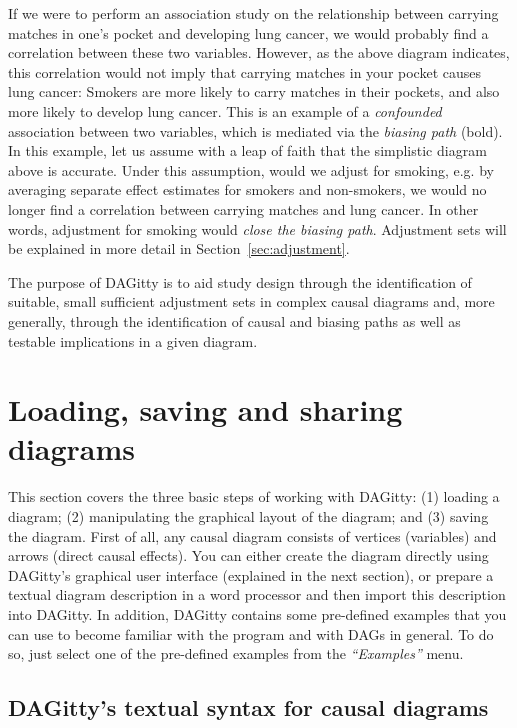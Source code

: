 \documentclass[a4paper,10pt]{article}
\newcommand{\pname}{{\sc DAG}itty\xspace}
\newcommand{\action}[1]{\emph{``#1''}}
\begin{document}
If we were to perform an association 
study on the relationship between carrying matches
in one's pocket and developing lung cancer, we would probably find a 
correlation between these two variables. However, as the above diagram
indicates, this correlation would not imply that carrying matches in 
your pocket causes lung cancer: Smokers are more likely to carry matches
in their pockets, and also more likely to develop lung cancer. This is an
example of a \emph{confounded} association between two variables,
which is mediated via the \emph{biasing path} (bold). 
In this example, let us assume with a leap of faith that the simplistic diagram
above is accurate. Under this assumption, would we adjust for smoking, 
e.g. by averaging separate effect estimates for 
smokers and non-smokers, we would  
no longer find a correlation between carrying matches and lung cancer.
In other words, adjustment for smoking would \emph{close the biasing path}.
Adjustment sets will be explained in more detail in 
Section~\ref{sec:adjustment}.

The purpose of \pname is to aid study design through the identification of 
suitable, small sufficient adjustment sets in complex causal diagrams and,
more generally, through the identification of causal and biasing paths as
well as testable implications in a given diagram. 

\section{Loading, saving  and sharing diagrams}

\label{sec:diagramcreation}

This section covers the three basic steps of working with \pname: 
(1) loading a diagram; (2) manipulating the graphical layout of the diagram; and
(3) saving the diagram. 
First of all, any causal diagram consists of vertices (variables) and arrows 
(direct causal effects).
You can either create the diagram directly using \pname's graphical user
interface (explained in the next section),
or prepare a textual diagram description in a word processor 
and then import this
description into \pname. In addition, \pname
contains some pre-defined examples that you can use to become familiar
with the program and with DAGs in general. 
To do so, just select one of the pre-defined examples from
the \action{Examples} menu.

\subsection{\pname's textual syntax for causal diagrams} 
\end{document}
